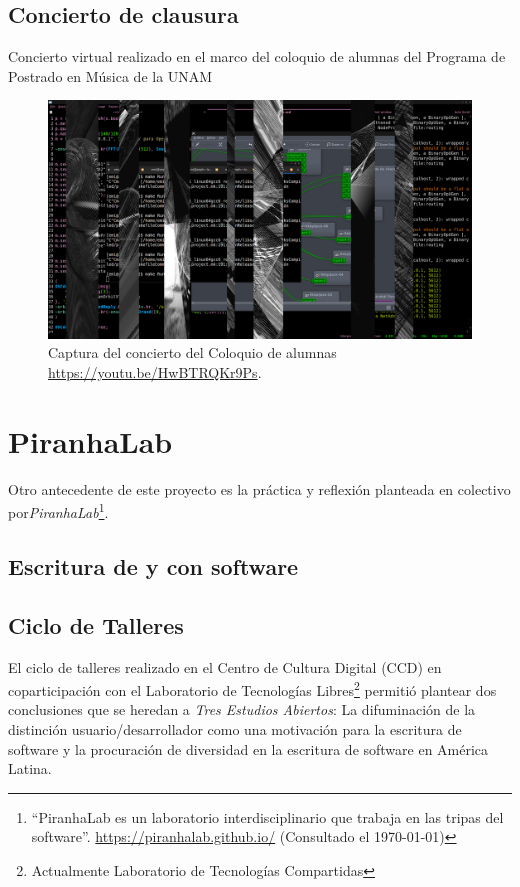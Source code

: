 \subsection{Concierto de clausura}

Concierto virtual realizado en el marco del coloquio de alumnas del Programa de Postrado en Música de la UNAM

\begin{figure}[tb]
\centering 
\includegraphics[width=\columnwidth]{../../img/col2.png} 
\caption[Concierto coloquio]{Captura del concierto del Coloquio de alumnas \url{https://youtu.be/HwBTRQKr9Ps}.} %
\label{fig:gallery} 
\end{figure}

\section{PiranhaLab}

Otro antecedente de este proyecto es la práctica y reflexión planteada en colectivo por\textit{PiranhaLab}\footnote{``PiranhaLab es un laboratorio interdisciplinario que trabaja en las tripas del software''. \url{https://piranhalab.github.io/} (Consultado el \today)}.

\subsection{Escritura de y con software}

\subsection{Ciclo de Talleres}

El ciclo de talleres realizado en el Centro de Cultura Digital (CCD) en coparticipación con el Laboratorio de Tecnologías Libres\footnote{Actualmente Laboratorio de Tecnologías Compartidas} permitió plantear dos conclusiones que se heredan a \textit{Tres Estudios Abiertos}: La difuminación de la distinción usuario/desarrollador como una motivación para la escritura de software y la procuración de diversidad en la escritura de software en América Latina.

